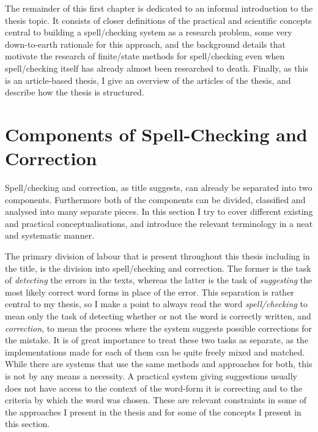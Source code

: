 \documentclass[officiallayout]{unihelcompling}
\begin{document}
The remainder of this first chapter is dedicated to an informal introduction to
the thesis topic. It consists of closer definitions of the practical and
scientific concepts central to building a spell\-/checking system as a research
problem, some very down-to-earth rationale for this approach, and the
background details that motivate the research of finite\-/state methods for
spell\-/checking even when spell\-/checking itself has already almost been
researched to death. Finally, as this is an article-based thesis, I give an
overview of the articles of the thesis, and describe how the thesis is
structured.

\section{Components of Spell-Checking and Correction}
\label{sec:practical-components}

Spell\-/checking and correction, as title suggests, can already be
separated into two components. Furthermore both of the components can be
divided, classified and analysed into many separate pieces. In this section I
try to cover different existing and practical conceptualisations, and introduce
the relevant terminology in a neat and systematic manner.

The primary division of labour that is present throughout this thesis including
in the title, is the division into spell\-/checking and correction. The former is
the task of \emph{detecting} the errors in the texts, whereas the latter is the
task of \emph{suggesting} the most likely correct word forms in place of the
error. This separation is rather central to my thesis, so I make a point to
always read the word \emph{spell\-/checking} to mean only the task of detecting
whether or not the word is correctly written, and \emph{correction}, to mean
the process where the system suggests possible corrections for the mistake.  It
is of great importance to treat these two tasks as separate, as the
implementations made for each of them can be quite freely mixed and matched.
While there are systems that use the same methods and approaches for both, this
is not by any means a necessity. A practical system giving suggestions usually
does not have access to the context of the word-form it is correcting and to
the criteria by which the word was chosen. These are relevant constraints in
some of the approaches I present in the thesis and for some of the concepts I
present in this section.
\end{document}

